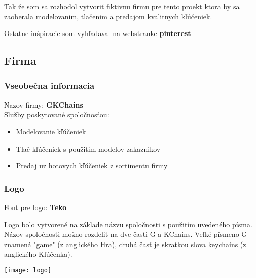       Tak že som sa rozhodol vytvoriť fiktivnu firmu pre tento proekt ktora by sa zaoberala modelovanim, tlačenim a predajom kvalitnych kľúčeniek.

      Ostatne inšpiracie som vyhľadaval na webstranke \textbf{\href{https://pinterest.com}{pinterest}}

    \subsection{Firma}
      \subsubsection{Vseobečna informacia}
      Nazov firmy: \textbf{GKChains} \\
      Služby poskytované spoločnosťou:
      \begin{itemize}
        \item{Modelovanie kľúčeniek}
        \item{Tlač kľúčeniek s použitim modelov zakaznikov}
        \item{Predaj uz hotovych kľúčeniek z sortimentu firmy}
      \end{itemize}
      \subsubsection{Logo}
      Font pre logo: \textbf{\href{https://fonts.google.com/specimen/Teko?query=Teko}{Teko}}

      Logo bolo vytvorené na základe názvu spoločnosti s použitím uvedeného písma. Názov spoločnosti možno rozdeliť na dve časti G a KChains. Veľké písmeno G znamená "game" (z anglického Hra), druhá časť je skratkou slova keychains (z anglického Kľúčenka).

      \begin{center}
      \end{center}
      \texttt{[image: logo]}

